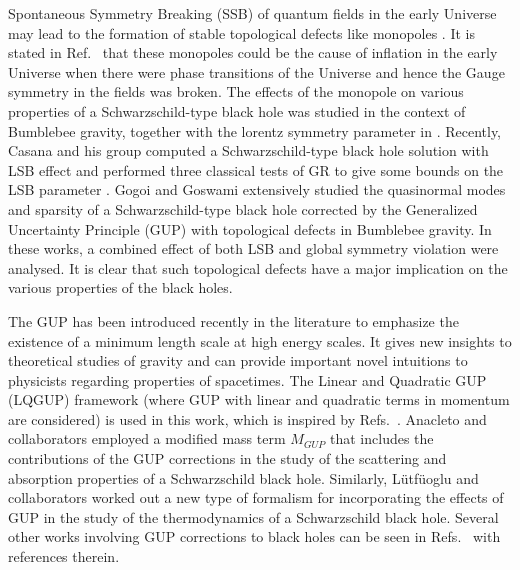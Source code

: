 \documentclass[aps,amsmath,amssymb,showpacs,showkeys]{revtex4}
\begin{document}
Spontaneous Symmetry Breaking (SSB) of quantum fields in the early Universe 
may lead to the formation of stable topological defects like 
monopoles \cite{21}. It is stated in Ref.~\cite{18} that these monopoles 
could be the cause of inflation \cite{inf} in the early Universe when there 
were phase transitions of the Universe and hence the Gauge symmetry in the
fields was broken. The effects of the monopole on various properties of a 
Schwarzschild-type black hole was studied in the context of Bumblebee gravity, 
together with the lorentz symmetry parameter in \cite{18}. Recently, Casana 
and his group computed a Schwarzschild-type black hole solution with LSB effect 
and performed three classical tests of GR to give some bounds on the LSB 
parameter \cite{17}. Gogoi and Goswami \cite{20} extensively studied the 
quasinormal modes and sparsity of a Schwarzschild-type black hole corrected by 
the Generalized Uncertainty Principle (GUP) with topological defects in 
Bumblebee gravity. In these works, a combined effect of both LSB and global 
symmetry violation were analysed. It is clear that such topological defects 
have a major implication on the various properties of the black holes. 

The GUP \cite{43,44,45,46,47,48,481,49,50,39,40,40-1,40-2,40-3,40-4,40-5,40-6,40-7,40-8,40-9,40-10, 40-11,40-12,40-13,40-14,40-15,40-16,40-17} 
has been introduced recently in the literature to emphasize
the existence of a minimum length scale at high energy scales. It gives new
insights to theoretical studies of gravity and can provide important novel
intuitions to physicists regarding properties of spacetimes. The Linear and
Quadratic GUP (LQGUP) framework (where GUP with linear and quadratic terms
in momentum are considered) is used in this work, which is inspired
by Refs.~\cite{43,44,45,46,47,48,481}.  Anacleto and collaborators \cite{39,49}
employed a modified mass term $M_{GUP}$ that includes the contributions of
the GUP corrections in the study of the scattering and absorption properties
of a Schwarzschild black hole.  Similarly, L\"{u}tf\"{u}oglu and collaborators
\cite{40} worked out a new type of formalism for incorporating the effects of
GUP in the study of the thermodynamics of a Schwarzschild black hole.
Several other works involving GUP corrections to black holes can be seen in
Refs.~\cite{20,50} with references therein. 
\end{document}
